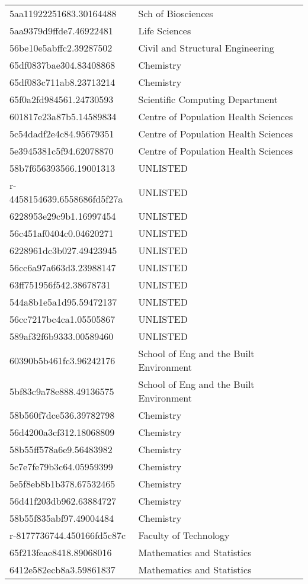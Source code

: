 \begin{tabular}{ll}
5aa11922251683.30164488 & Sch of Biosciences \\
5aa9379d9ffde7.46922481 & Life Sciences \\
56be10e5abffc2.39287502 & Civil and Structural Engineering \\
65df0837bae304.83408868 & Chemistry \\
65df083c711ab8.23713214 & Chemistry \\
65f0a2fd984561.24730593 & Scientific Computing Department \\
601817e23a87b5.14589834 & Centre of Population Health Sciences \\
5c54dadf2e4c84.95679351 & Centre of Population Health Sciences \\
5e3945381c5f94.62078870 & Centre of Population Health Sciences \\
58b7f656393566.19001313 & UNLISTED \\
r-4458154639.6558686fd5f27a & UNLISTED \\
6228953e29c9b1.16997454 & UNLISTED \\
56c451af0404c0.04620271 & UNLISTED \\
6228961dc3b027.49423945 & UNLISTED \\
56cc6a97a663d3.23988147 & UNLISTED \\
63ff751956f542.38678731 & UNLISTED \\
544a8b1e5a1d95.59472137 & UNLISTED \\
56cc7217bc4ca1.05505867 & UNLISTED \\
589af32f6b9333.00589460 & UNLISTED \\
60390b5b461fc3.96242176 & School of Eng and the Built Environment \\
5bf83c9a78e888.49136575 & School of Eng and the Built Environment \\
58b560f7dce536.39782798 & Chemistry \\
56d4200a3cf312.18068809 & Chemistry \\
58b55ff578a6e9.56483982 & Chemistry \\
5c7e7fe79b3c64.05959399 & Chemistry \\
5e5f8eb8b1b378.67532465 & Chemistry \\
56d41f203db962.63884727 & Chemistry \\
58b55f835abf97.49004484 & Chemistry \\
r-8177736744.450166fd5c87c & Faculty of Technology \\
65f213feae8418.89068016 & Mathematics and Statistics \\
6412e582ecb8a3.59861837 & Mathematics and Statistics \\

\end{tabular}
